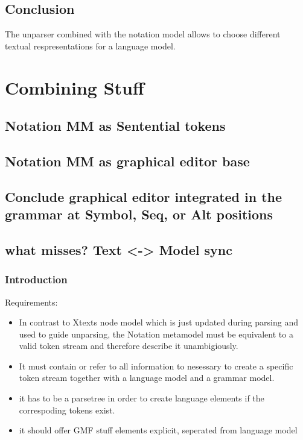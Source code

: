 \section{Conclusion}
The unparser combined with the notation model allows to choose different textual respresentations for a language model. 



\chapter{Combining Stuff}
\section{Notation MM as Sentential tokens}
\section{Notation MM as graphical editor base}
\section{Conclude graphical editor integrated in the grammar at Symbol, Seq, or Alt positions}
\section{what misses? Text <-> Model sync}





\subsection{Introduction}
Requirements:
\begin{itemize}
	\item In contrast to Xtexts node model which is just updated during parsing and used to guide unparsing, the Notation metamodel must be equivalent to a valid token stream and therefore describe it unambigiously. 
	\item It must contain or refer to all information to nesessary to create a specific token stream together with a language model and a grammar model.   
	\item it has to be a parsetree in order to create language elements if the correspoding tokens exist.
	\item it should offer GMF stuff elements 
	explicit, seperated from language model
\end{itemize}




